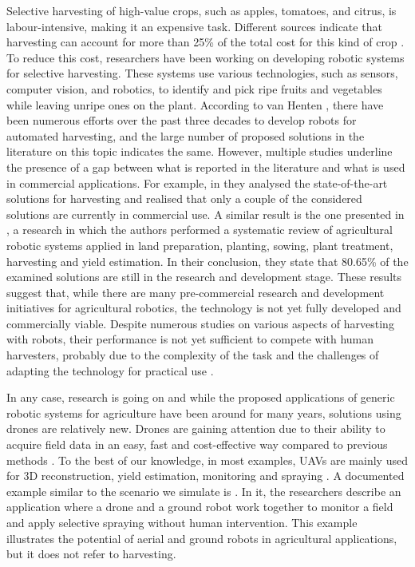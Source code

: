 \documentclass[letterpaper,twocolumn,10pt]{article}
\begin{document}
Selective harvesting of high-value crops, such as apples, tomatoes, and citrus,  is labour-intensive, making it an expensive task. Different sources indicate that harvesting can account for more than 25\% of the total cost for this kind of crop \cite{DutchCost, CostOrange}. 
To reduce this cost, researchers have been working on developing robotic systems for selective harvesting. These systems use various technologies, such as sensors, computer vision, and robotics, to identify and pick ripe fruits and vegetables while leaving unripe ones on the plant. 
According to van Henten \cite{RobotInHarvesting}, there have been numerous efforts over the past three decades to develop robots for automated harvesting, and the large number of proposed solutions in the literature on this topic indicates the same. However, multiple studies underline the presence of a gap between what is reported in the literature and what is used in commercial applications.
For example, in \cite{e47335bdec694548b75225d317700e43} they analysed the state-of-the-art solutions for harvesting and realised that only a couple of the considered solutions are currently in commercial use.
A similar result is the one presented in \cite{robotics10020052}, a research in which the authors performed a systematic review of agricultural robotic systems applied in land preparation, planting, sowing, plant treatment, harvesting and yield estimation. In their conclusion, they state that 80.65\% of the examined solutions are still in the research and development stage. These results suggest that, while there are many pre-commercial research and development initiatives for agricultural robotics, the technology is not yet fully developed and commercially viable. Despite numerous studies on various aspects of harvesting with robots, their performance is not yet sufficient to compete with human harvesters, probably due to the complexity of the task and the challenges of adapting the technology for practical use \cite{e47335bdec694548b75225d317700e43}.

In any case, research is going on and while the proposed applications of generic robotic systems for agriculture have been around for many years, solutions using drones are relatively new. Drones are gaining attention due to their ability to acquire field data in an easy, fast and cost-effective way compared to previous methods \cite{info10110349}. 
To the best of our knowledge, in most examples, UAVs are mainly used for 3D reconstruction, yield estimation, monitoring and spraying \cite{HAFEEZ2022, 9316211}.
A documented example similar to the scenario we simulate is \cite{GroundAndAerial}. In it, the researchers describe an application where a drone and a ground robot work together to monitor a field and apply selective spraying without human intervention. This example illustrates the potential of aerial and ground robots in agricultural applications, but it does not refer to harvesting.
\end{document}
